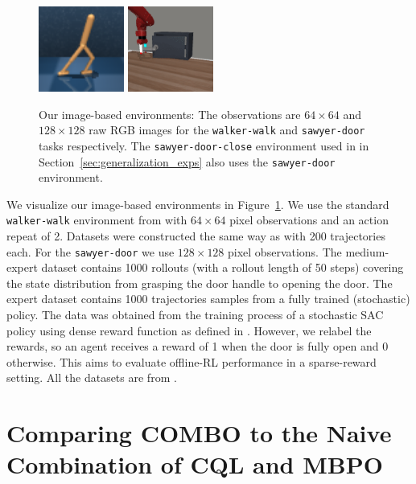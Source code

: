 \begin{figure}[ht]
    \centering
    \includegraphics[width=0.25\textwidth]{chapters/combo/walker_task.png}
    \includegraphics[width=0.25\textwidth]{chapters/combo/dooropen_task.png}
    \vspace{-0.2cm}
    \caption{\footnotesize Our image-based environments: The observations are $64\times 64$ and $128\times 128$ raw RGB images for the \texttt{walker-walk} and \texttt{sawyer-door} tasks respectively. The \texttt{sawyer-door-close} environment used in in Section~\ref{sec:generalization_exps} also uses the \texttt{sawyer-door} environment.}
    \label{fig:visual}
\end{figure}


We visualize our image-based environments in Figure~\ref{fig:visual}. We use the standard \texttt{walker-walk} environment from \citet{tassa2018deepmind} with $64\times64$ pixel observations and an action repeat of 2. Datasets were constructed the same way as \citet{fu2020d4rl} with 200 trajectories each. For the \texttt{sawyer-door} we use $128\times128$ pixel observations. The medium-expert dataset contains 1000 rollouts (with a rollout length of 50 steps) covering the state distribution from grasping the door handle to opening the door. The expert dataset contains 1000 trajectories samples from a fully trained (stochastic) policy. The data was obtained from the training process of a stochastic SAC policy using dense reward function as defined in \citet{yu2020metaworld}. However, we relabel the rewards, so an agent receives a reward of 1 when the door is fully open and 0 otherwise. This aims to evaluate offline-RL performance in a sparse-reward setting. All the datasets are from \citep{Rafailov2020LOMPO}.


\section{Comparing COMBO to the Naive Combination of CQL and MBPO}
\label{app:cql_mbpo}


